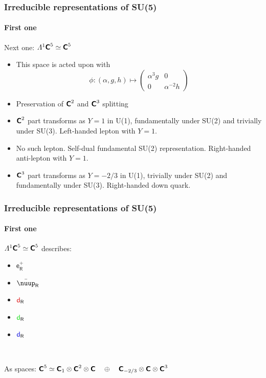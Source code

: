 \documentclass[english, fleqn]{beamer}
\begin{document}
\begin{frame}
    \frametitle{Irreducible representations of SU(5)}
    \framesubtitle{First one}

    Next one: $\Lambda^1 \text{\bfseries\sffamily{C}}^5 \simeq \text{\bfseries\sffamily{C}}^5$

    \begin{itemize}
        \item 

    
    This space is acted upon with
    \[
            \phi\colon 
             (\alpha, g, h)  \mapsto
            \begin{pmatrix}
                \alpha^3 g & 0 \\
                0 & \alpha^{-2} h
            \end{pmatrix}
    \]


    \item
        Preservation of $\text{\bfseries\sffamily{C}}^2$ and $\text{\bfseries\sffamily{C}}^3$ splitting
    \item
        $\text{\bfseries\sffamily{C}}^2$ part transforms as $Y = 1$ in U(1), fundamentally under SU(2)
        and trivially under SU(3). Left-handed lepton with $Y = 1$.
    \item
        No such lepton. Self-dual fundamental SU(2) representation. Right-handed anti-lepton with $Y = 1$.
    \item
        $\text{\bfseries\sffamily{C}}^3$ part transforms as $Y = - 2/3$ in U(1), trivially under
        SU(2) and fundamentally under SU(3). Right-handed down quark.
    \end{itemize}
\end{frame}

\begin{frame}
    \frametitle{Irreducible representations of SU(5)}
    \framesubtitle{First one}

    $\Lambda^1 \text{\bfseries\sffamily{C}}^5 \simeq \text{\bfseries\sffamily{C}}^5$ describes:
    \begin{itemize}
        \item $\mathsf e^+_\mathsf R$
        \item $\bar\nuup_\mathsf R$
        \item $\textcolor{qred}  {\mathsf d}_\mathsf R$
        \item $\textcolor{qgreen}{\mathsf d}_\mathsf R$
        \item $\textcolor{qblue} {\mathsf d}_\mathsf R$
    \end{itemize}

    \

    As spaces:
    $\text{\bfseries\sffamily{C}}^5 \simeq \text{\bfseries\sffamily{C}}_1 \otimes \text{\bfseries\sffamily{C}}^2 \otimes \text{\bfseries\sffamily{C}} \quad\oplus\quad \text{\bfseries\sffamily{C}}_{-2/3} \otimes \text{\bfseries\sffamily{C}} \otimes \text{\bfseries\sffamily{C}}^3$
\end{frame}
\end{document}
